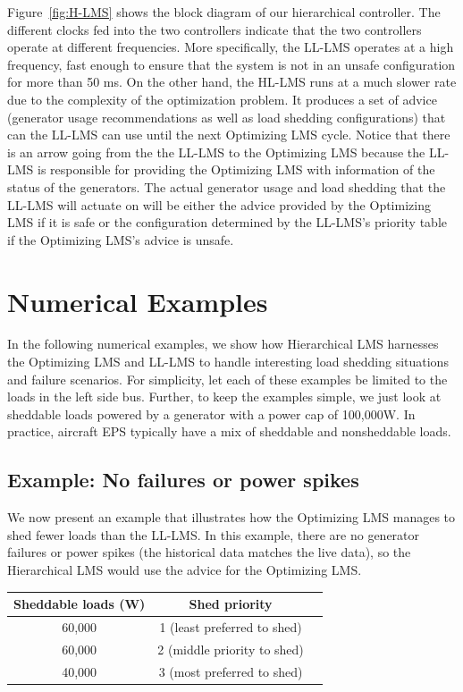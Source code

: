 \documentclass{acm_proc_article-sp}
\begin{document}
Figure~\ref{fig:H-LMS} shows the block diagram of our hierarchical controller. The different clocks fed into the two controllers indicate that the two
controllers operate at different frequencies. More specifically, the LL-LMS operates at a high frequency, fast enough to ensure that the system is not
in an unsafe configuration for more than 50 ms. On the other hand, the HL-LMS runs at a much slower rate due to the complexity of the optimization problem.
It produces a set of advice (generator usage recommendations as well as load shedding configurations) that can the LL-LMS can use until the next Optimizing LMS 
cycle. Notice that there is an arrow going from the the LL-LMS to the Optimizing LMS because the LL-LMS is responsible for providing the Optimizing LMS with information of
the status of the generators. The actual generator usage and load shedding that the LL-LMS will actuate on will be either the advice provided by the Optimizing LMS
if it is safe or the configuration determined by the LL-LMS's priority table if the Optimizing LMS's advice is unsafe.

\section{Numerical Examples}
\label{sec:numerical-examples}
In the following numerical examples, we show how Hierarchical LMS harnesses the Optimizing LMS and LL-LMS to handle interesting load shedding situations and failure scenarios.
For simplicity, let each of these examples be limited to the loads in the left side bus.
Further, to keep the examples simple, we just look at sheddable loads powered by a generator with a power cap of 100,000W.
In practice, aircraft EPS typically have a mix of sheddable and nonsheddable loads.

\subsection{Example: No failures or power spikes}
We now present an example that illustrates how the Optimizing LMS manages to shed fewer loads than the LL-LMS. 
In this example, there are no generator failures or power spikes (the historical data matches the live data), so the Hierarchical LMS would use the advice for the Optimizing LMS.

\begin{tabular}{c|cc}
Sheddable loads (W) & Shed priority \\ \hline
60,000 & 1 (least preferred to shed) \\
60,000 & 2 (middle priority to shed) \\ 
40,000 & 3 (most preferred to shed) \\ \hline
\end{tabular}
\end{document}
